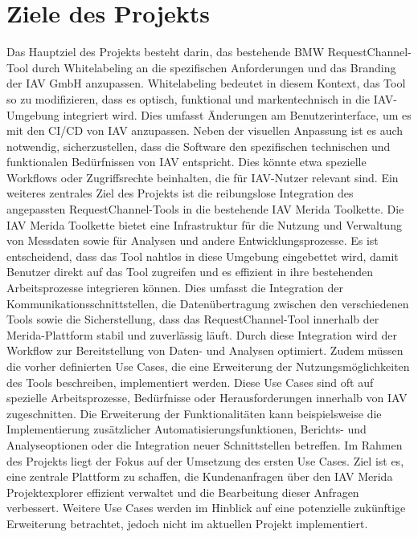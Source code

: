 \section{Ziele des Projekts}
Das Hauptziel des Projekts besteht darin, das bestehende BMW RequestChannel-Tool durch Whitelabeling an die spezifischen Anforderungen und das Branding der IAV GmbH anzupassen. Whitelabeling bedeutet in diesem Kontext, das Tool so zu modifizieren, dass es optisch, funktional und markentechnisch in die IAV-Umgebung integriert wird. Dies umfasst Änderungen am Benutzerinterface, um es mit den \ac{CI/CD} von IAV anzupassen. Neben der visuellen Anpassung ist es auch notwendig, sicherzustellen, dass die Software den spezifischen technischen und funktionalen Bedürfnissen von IAV entspricht. Dies könnte etwa spezielle Workflows oder Zugriffsrechte beinhalten, die für IAV-Nutzer relevant sind.
\newline
\newline
Ein weiteres zentrales Ziel des Projekts ist die reibungslose Integration des angepassten RequestChannel-Tools in die bestehende IAV Merida Toolkette. Die IAV Merida Toolkette bietet eine Infrastruktur für die Nutzung und Verwaltung von Messdaten sowie für Analysen und andere Entwicklungsprozesse. Es ist entscheidend, dass das Tool nahtlos in diese Umgebung eingebettet wird, damit Benutzer direkt auf das Tool zugreifen und es effizient in ihre bestehenden Arbeitsprozesse integrieren können. Dies umfasst die Integration der Kommunikationsschnittstellen, die Datenübertragung zwischen den verschiedenen Tools sowie die Sicherstellung, dass das RequestChannel-Tool innerhalb der Merida-Plattform stabil und zuverlässig läuft. Durch diese Integration wird der Workflow zur Bereitstellung von Daten- und Analysen optimiert. 
\newline
\newline
Zudem müssen die vorher definierten Use Cases, die eine Erweiterung der Nutzungsmöglichkeiten des Tools beschreiben, implementiert werden. Diese Use Cases sind oft auf spezielle Arbeitsprozesse, Bedürfnisse oder Herausforderungen innerhalb von IAV zugeschnitten. Die Erweiterung der Funktionalitäten kann beispielsweise die Implementierung zusätzlicher Automatisierungsfunktionen, Berichts- und Analyseoptionen oder die Integration neuer Schnittstellen betreffen. 
\newline
Im Rahmen des Projekts liegt der Fokus auf der Umsetzung des ersten Use Cases. Ziel ist es, eine zentrale Plattform zu schaffen, die Kundenanfragen über den IAV Merida Projektexplorer effizient verwaltet und die Bearbeitung dieser Anfragen verbessert. Weitere Use Cases werden im Hinblick auf eine potenzielle zukünftige Erweiterung betrachtet, jedoch nicht im aktuellen Projekt implementiert.
